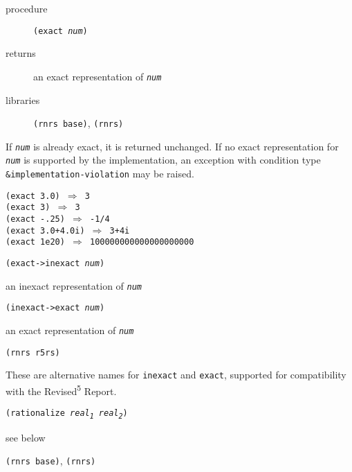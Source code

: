 \begin{description}

\label{objects_s114}\item[procedure] \texttt{(exact \textit{num})}



\item[returns] an exact representation of \texttt{\textit{num}}


\item[libraries] \texttt{(rnrs base)}, \texttt{(rnrs)}
\end{description}


\label{objects_s115}If \texttt{\textit{num}} is already exact, it is returned unchanged.
If no exact representation for \texttt{\textit{num}} is supported by the
implementation, an exception with condition type \texttt{\&{}implementation-violation}
may be raised.


\begin{alltt}
(exact 3.0) \(\Rightarrow\) 3
(exact 3) \(\Rightarrow\) 3
(exact -.25) \(\Rightarrow\) -1/4
(exact 3.0+4.0i) \(\Rightarrow\) 3+4i
(exact 1e20) \(\Rightarrow\) 100000000000000000000
\end{alltt}

\begin{description}

\label{objects_s116}\item[procedure] \texttt{(exact-\textgreater{}inexact \textit{num})}



\item[returns] an inexact representation of \texttt{\textit{num}}


\item[procedure] \texttt{(inexact-\textgreater{}exact \textit{num})}



\item[returns] an exact representation of \texttt{\textit{num}}


\item[libraries] \texttt{(rnrs r5rs)}
\end{description}


These are alternative names for \texttt{inexact} and \texttt{exact},
supported for compatibility with the Revised\textsuperscript{5} Report.


\begin{description}

\label{objects_s117}\item[procedure] \texttt{(rationalize \textit{real\textsubscript{1}} \textit{real\textsubscript{2}})}



\item[returns] see below


\item[libraries] \texttt{(rnrs base)}, \texttt{(rnrs)}
\end{description}

